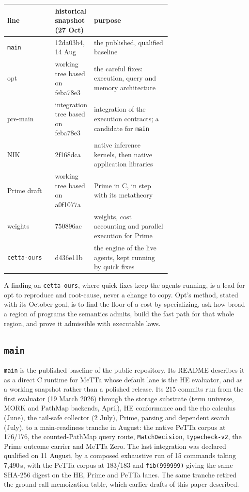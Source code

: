 \documentclass[11pt]{article}
\newcommand{\code}[1]{\texttt{#1}}
\newcommand{\PeTTa}{\textup{PeTTa}}
\newcommand{\HE}{\textup{HE}}
\newcommand{\PathMap}{\textup{PathMap}}
\begin{document}
\begin{center}
\small
\begin{tabular}{@{}lp{0.20\linewidth}p{0.47\linewidth}@{}}
\toprule
line & historical snapshot (27 Oct) & purpose \\
\midrule
\code{main} & 12da03b4, 14 Aug & the published, qualified baseline \\
opt & working tree based on feba78e3 & the careful fixes: execution, query and memory architecture \\
pre-main & integration tree based on feba78e3 & integration of the execution contracts; a candidate for \code{main} \\
NIK & 2f168dca & native inference kernels, then native application libraries \\
Prime draft & working tree based on a0f1077a & Prime in C, in step with its metatheory \\
weights & 750896ae & weights, cost accounting and parallel execution for Prime \\
\code{cetta-ours} & d436e11b & the engine of the live agents, kept running by quick fixes \\
\bottomrule
\end{tabular}
\end{center}

\noindent
A finding on \code{cetta-ours}, where quick fixes keep the agents running, is
a lead for opt to reproduce and root-cause, never a change to copy.  Opt's
method, stated with its October goal, is to find the floor of a cost by
specializing, ask how broad a region of programs the semantics admits, build
the fast path for that whole region, and prove it admissible with executable
laws.

\subsection{\code{main}}
\label{sec:line-main}

\code{main} is the published baseline of the public repository.  Its README
describes it as a direct C runtime for MeTTa whose default lane is the \HE{}
evaluator, and as a working snapshot rather than a polished release.  Its 215
commits run from the first evaluator (19 March 2026) through the
storage substrate (term universe, MORK and \PathMap{} backends, April), \HE{}
conformance and the rho calculus (June), the tail-safe collector (2 July),
Prime, parsing and dependent search (July), to a main-readiness tranche in
August: the native \PeTTa{} corpus at 176/176, the counted-\PathMap{} query
route, \code{MatchDecision}, \code{typecheck-v2}, the Prime outcome carrier
and MeTTa Zero.  The last integration was declared qualified on 11 August, by
a composed exhaustive run of 15 commands taking 7{,}490\,s, with the \PeTTa{}
corpus at 183/183 and \code{fib(999999)} giving the same SHA-256 digest on
the \HE{}, Prime and \PeTTa{} lanes.  The same tranche retired the ground-call
memoization table, which earlier drafts of this paper described.
\end{document}
